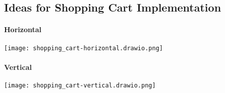 \begin{landscape}
    \section{Ideas for Shopping Cart Implementation}

    \begin{minipage}[t]{1\textwidth}
        \paragraph{Horizontal}
        \begin{center}
            \texttt{[image: shopping\_cart-horizontal.drawio.png]}
        \end{center}
    \end{minipage}
    \begin{minipage}[t]{0.6\textwidth}
        \paragraph{Vertical}
        \begin{center}
            \texttt{[image: shopping\_cart-vertical.drawio.png]}
        \end{center}
    \end{minipage}
    

\end{landscape}
